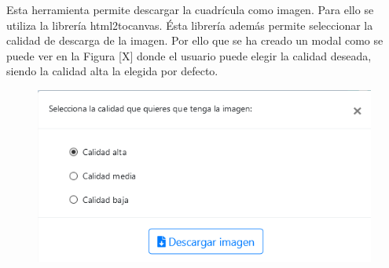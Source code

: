Esta herramienta permite descargar la cuadrícula como imagen. Para ello se utiliza la librería html2tocanvas. Ésta librería además permite seleccionar la calidad de descarga de la imagen. Por ello que se ha creado un modal como se puede ver en la Figura [X] donde el usuario puede elegir la calidad deseada, siendo la calidad alta la elegida por defecto. 


\begin{figure}[h!]
	\centering
	\includegraphics[width=0.7\linewidth]{Imagenes/Bitmap/modalDescargarTablero}
	\caption{}
	\label{fig:modaldescargartablero}
\end{figure}




